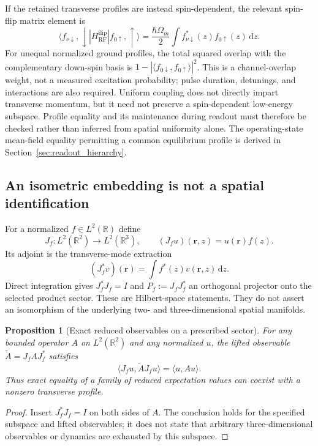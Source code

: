 \documentclass[11pt,a4paper]{article}
\newtheorem{proposition}{Proposition}[section]
\theoremstyle{definition}
\theoremstyle{remark}
\newcommand{\dd}{\mathrm{d}}
\newcommand{\R}{\mathbb{R}}
\begin{document}
If the retained transverse profiles are instead spin-dependent, the relevant spin-flip matrix element is
\[
 \langle f_{\nu\downarrow},\downarrow|
 H_{\mathrm{RF}}^{\mathrm{flip}}|f_{0\uparrow},\uparrow\rangle
 =\frac{\hbar\Omega_m}{2}
   \int f_{\nu\downarrow}^*(z)f_{0\uparrow}(z)\,\dd z.
\]
For unequal normalized ground profiles, the total squared overlap with the complementary down-spin basis is
$1-|\langle f_{0\downarrow},f_{0\uparrow}\rangle|^2$.
This is a channel-overlap weight, not a measured excitation probability; pulse duration, detunings, and interactions are also required. Uniform coupling does not directly impart transverse momentum, but it need not preserve a spin-dependent low-energy subspace. Profile equality and its maintenance during readout must therefore be checked rather than inferred from spatial uniformity alone. The operating-state mean-field equality permitting a common equilibrium profile is derived in Section~\ref{sec:readout_hierarchy}.\cite{zhang2026,precursor}

\subsection{An isometric embedding is not a spatial identification}
For a normalized $f\in L^2(\R)$ define
\begin{equation}
 J_f:L^2(\R^2)\longrightarrow L^2(\R^3),
 \qquad (J_f u)(\boldsymbol r,z)=u(\boldsymbol r)f(z).
 \label{eq:isometry}
\end{equation}
Its adjoint is the transverse-mode extraction
\begin{equation}
 (J_f^*v)(\boldsymbol r)=\int f^*(z)v(\boldsymbol r,z)\,\dd z.
 \label{eq:adjoint}
\end{equation}
Direct integration gives $J_f^*J_f=I$ and $P_f:=J_fJ_f^*$ an orthogonal projector onto the selected product sector. These are Hilbert-space statements. They do not assert an isomorphism of the underlying two- and three-dimensional spatial manifolds.

\begin{proposition}[Exact reduced observables on a prescribed sector]
For any bounded operator $A$ on $L^2(\R^2)$ and any normalized $u$, the lifted observable $\widetilde A=J_fAJ_f^*$ satisfies
\begin{equation}
 \langle J_fu,\widetilde A J_fu\rangle
 =\langle u,Au\rangle.
 \label{eq:expectation_lift}
\end{equation}
Thus exact equality of a family of reduced expectation values can coexist with a nonzero transverse profile.
\end{proposition}
\begin{proof}
Insert $J_f^*J_f=I$ on both sides of $A$. The conclusion holds for the specified subspace and lifted observables; it does not state that arbitrary three-dimensional observables or dynamics are exhausted by this subspace.
\end{proof}
\end{document}
